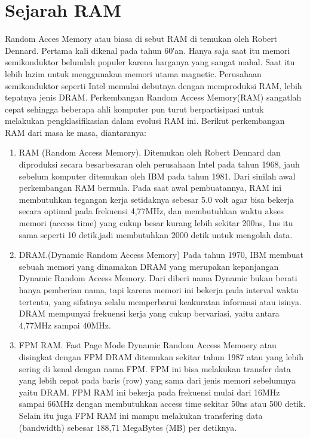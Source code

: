 \section{Sejarah RAM}
Random Acces Memory atau biasa di sebut RAM di temukan oleh Robert Dennard.
Pertama kali dikenal pada tahun 60′an. Hanya saja saat itu memori semikonduktor belumlah populer karena harganya yang sangat mahal. Saat itu lebih lazim untuk menggunakan memori utama magnetic. Perusahaan semikonduktor seperti Intel memulai debutnya dengan memproduksi RAM, lebih tepatnya jenis DRAM. 
Perkembangan Random Access Memory(RAM) sangatlah cepat sehingga beberapa ahli komputer pun turut berpartisipasi untuk melakukan pengklasifikasian dalam evolusi RAM ini. 
Berikut perkembangan RAM dari masa ke masa, diantaranya:
\begin{enumerate}
\item RAM (Random Access Memory). Ditemukan oleh Robert Dennard dan diproduksi secara besar\-besaran oleh perusahaan Intel pada tahun 1968, jauh sebelum komputer ditemukan oleh IBM pada tahun 1981. Dari sinilah awal perkembangan RAM bermula. Pada saat awal pembuatannya, RAM ini membutuhkan tegangan kerja setidaknya sebesar 5.0 volt agar bisa bekerja secara optimal pada frekuensi 4,77MHz, dan membutuhkan waktu akses memori (access time) yang cukup besar kurang lebih sekitar 200ns, 1ns itu sama seperti 10 detik,jadi membutuhkan 2000 detik untuk mengolah data.

\item DRAM.(Dynamic Random Access Memory) Pada tahun 1970, IBM membuat sebuah memori yang dinamakan DRAM yang merupakan kepanjangan Dynamic Random Access Memory. Dari diberi nama Dynamic bukan berati hanya pemberian nama, tapi karena memori ini bekerja pada interval waktu tertentu, yang sifatnya selalu memperbarui keakuratan informasi atau isinya. DRAM mempunyai frekuensi kerja yang cukup bervariasi, yaitu antara 4,77MHz sampai 40MHz. 

\item FPM RAM. Fast Page Mode Dynamic Random Access Memoery atau disingkat dengan FPM DRAM ditemukan sekitar tahun 1987 atau yang lebih sering di kenal dengan nama FPM. FPM ini bisa melakukan transfer data yang lebih cepat pada baris (row) yang sama dari jenis memori sebelumnya yaitu DRAM. FPM RAM ini bekerja pada frekuensi mulai dari 16MHz sampai 66MHz dengan membutuhkan access time sekitar 50ns atau 500 detik. Selain itu juga FPM RAM ini mampu melakukan transfering data (bandwidth) sebesar 188,71 MegaBytes (MB) per detiknya.


\end{enumerate}
